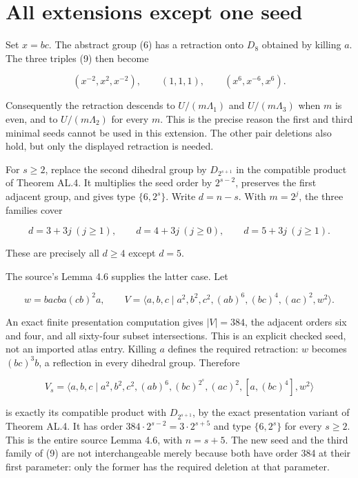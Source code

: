 \section{All extensions except one seed}\label{all-extensions-except-one-seed}

Set \(x=bc\). The abstract group (6) has a retraction onto \(D_8\) obtained
by killing \(a\). The three triples (9) then become

\[ (x^{-2},x^2,x^{-2}),\qquad(1,1,1),\qquad
(x^6,x^{-6},x^6).\tag{10}\]

Consequently the retraction descends to \(U/(m\Lambda_1)\) and
\(U/(m\Lambda_3)\) when \(m\) is even, and to \(U/(m\Lambda_2)\) for every
\(m\). This is the precise reason the first and third minimal seeds
cannot be used in this extension. The other pair deletions also hold,
but only the displayed retraction is needed.

For \(s\geq2\), replace the second dihedral group by \(D_{2^{s+1}}\) in
the compatible product of Theorem AL.4. It multiplies the seed order by
\(2^{s-2}\), preserves the first adjacent group, and gives type
\(\{6,2^s\}\). Write \(d=n-s\). With \(m=2^j\), the three families cover

\[d=3+3j\ (j\geq1),\qquad d=4+3j\ (j\geq0),\qquad
 d=5+3j\ (j\geq1).\tag{11}\]

These are precisely all \(d\geq4\) except \(d=5\).

The source's Lemma 4.6 supplies the latter case. Let

\[ w=bacba(cb)^2a,\qquad
V=\langle a,b,c\mid a^2,b^2,c^2,(ab)^6,(bc)^4,(ac)^2,w^2\rangle.
\tag{12}\]

An exact finite presentation computation gives \(|V|=384\), the adjacent
orders six and four, and all sixty-four subset intersections. This is
an explicit checked seed, not an imported atlas entry. Killing \(a\)
defines the required retraction: \(w\) becomes \((bc)^3b\), a reflection
in every dihedral group. Therefore

\[V_s=\langle a,b,c\mid a^2,b^2,c^2,(ab)^6,(bc)^{2^s},(ac)^2,
[a,(bc)^4],w^2\rangle \tag{13}\]

is exactly its compatible product with \(D_{2^{s+1}}\), by the exact
presentation variant of Theorem AL.4. It has order
\(384\cdot2^{s-2}=3\cdot2^{s+5}\) and type \(\{6,2^s\}\) for every
\(s\geq2\). This is the entire source Lemma 4.6, with \(n=s+5\).
The new seed and the third family of (9) are not interchangeable merely
because both have order 384 at their first parameter: only the former
has the required deletion at that parameter.
